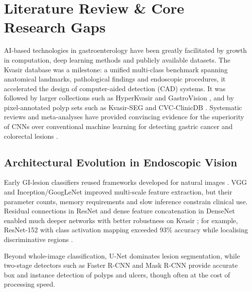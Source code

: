 \documentclass[conference]{IEEEtran}
\begin{document}
\section{Literature Review \& Core Research Gaps}
\label{sec:lit_review}

AI-based technologies in gastroenterology have been greatly facilitated by growth in computation, deep learning
methods and publicly available datasets. The Kvasir database \cite{pogorelov2017kvasir} was a milestone: a unified
multi-class benchmark spanning anatomical landmarks, pathological findings and endoscopic procedures, it accelerated
the design of computer-aided detection (CAD) systems. It was followed by larger collections such as HyperKvasir
\cite{borgli2020hyperkvasir} and GastroVision \cite{jha2023gastrovision}, and by pixel-annotated polyp sets such as
Kvasir-SEG \cite{jha2020kvasirseg} and CVC-ClinicDB \cite{bernal2015cvc}. Systematic reviews and meta-analyses have
provided convincing evidence for the superiority of CNNs over conventional machine learning for detecting gastric
cancer and colorectal lesions \cite{frontiers2026, wjg2025}.

\subsection{Architectural Evolution in Endoscopic Vision}
Early GI-lesion classifiers reused frameworks developed for natural images \cite{krizhevsky2012imagenet}. VGG
\cite{simonyan2014very} and Inception/GoogLeNet \cite{szegedy2015going, szegedy2016rethinking} improved multi-scale
feature extraction, but their parameter counts, memory requirements and slow inference constrain clinical use.
Residual connections in ResNet \cite{he2016deep} and dense feature concatenation in DenseNet \cite{huang2017densely}
enabled much deeper networks with better robustness on Kvasir \cite{mdpi2023sensors}; for example, ResNet-152 with
class activation mapping exceeded 93\% accuracy while localising discriminative regions
\cite{mdpi2023sensors, selvaraju2017grad}.

Beyond whole-image classification, U-Net \cite{ronneberger2015u} dominates lesion segmentation, while two-stage
detectors such as Faster R-CNN \cite{ren2015faster} and Mask R-CNN \cite{he2017mask} provide accurate box and
instance detection of polyps and ulcers, though often at the cost of processing speed.
\end{document}
